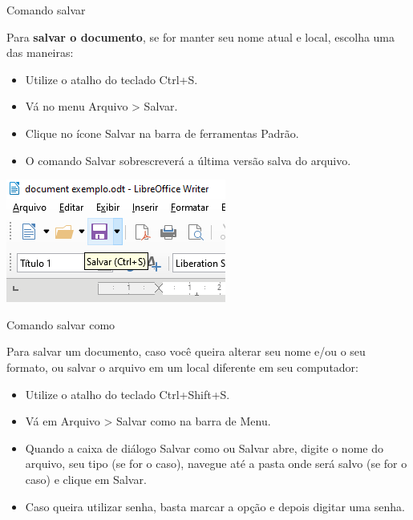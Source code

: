 \begin{frame}{Comando salvar}
	\begin{block}{}
		Para \textbf{salvar o documento}, se for manter seu nome atual e local, escolha uma das maneiras:
		\begin{itemize}
			\item Utilize o atalho do teclado Ctrl+S.
			\item Vá no menu Arquivo > Salvar.
			\item Clique no ícone Salvar na barra de ferramentas Padrão.
			\item O comando Salvar sobrescreverá a última versão salva do arquivo.
		\end{itemize}
	\end{block}

	\centering
	\includegraphics[width=0.6\linewidth]{Figuras/Ch04/fig34.1}
\end{frame}


\begin{frame}{Comando salvar como}
	\begin{block}{}
		Para salvar um documento, caso você queira alterar seu nome e/ou o seu formato, ou salvar o arquivo em um local diferente em seu computador:
		\begin{itemize}
			\item Utilize o atalho do teclado Ctrl+Shift+S.
			\item Vá em Arquivo > Salvar como na barra de Menu.
			\item Quando a caixa de diálogo Salvar como ou Salvar abre, digite o nome do arquivo, seu tipo (se for o caso), navegue até a pasta onde será salvo (se for o caso) e clique em Salvar.
			\item Caso queira utilizar senha, basta marcar a opção e depois digitar uma senha.
		\end{itemize}
	\end{block}
\end{frame}


